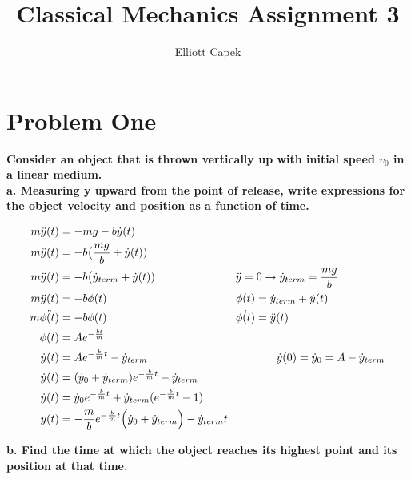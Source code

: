 \documentclass[10pt]{article} %
\title{Classical Mechanics Assignment 3}
\author{Elliott Capek}
\begin{document}
\maketitle{}

\section{Problem One}
\textbf{Consider an object that is thrown vertically up with initial speed $v_0$ in a linear medium.} \\

\textbf{a. Measuring y upward from the point of release, write expressions for the object velocity and position as a function of time.}

\begin{align*}
  m\ddot{y}(t) &= -mg - b\dot{y}(t)\\
  m\ddot{y}(t) &= -b\big(\frac{mg}{b} + \dot{y}(t))\\
  m\ddot{y}(t) &= -b\big(\dot{y}_{term} + \dot{y}(t))
  \hspace{1in}\ddot{y} = 0 \rightarrow \dot{y}_{term} = \frac{mg}{b}\\
  m\ddot{y}(t) &= -b\phi(t)
  \hspace{1.6in} \phi(t) = \dot{y}_{term} + \dot{y}(t)\\
  m\ddot{\phi(t)} &= -b\phi(t)
  \hspace{1.6in} \dot{\phi(t)} = \ddot{y}(t)\\
  \phi(t) &= Ae^{-\frac{bt}{m}}\\
  \dot{y}(t) &= Ae^{-\frac{b}{m}t} - \dot{y}_{term}
  \hspace{1.6in} \dot{y}(0) = \dot{y}_0 = A - \dot{y}_{term}\\
  \dot{y}(t) &= (\dot{y}_0 + \dot{y}_{term})e^{-\frac{b}{m}t} - \dot{y}_{term}\\
  \dot{y}(t) &= \dot{y}_0e^{-\frac{b}{m}t} + \dot{y}_{term}(e^{-\frac{b}{m}t} - 1)\\
  y(t) &= -\frac{m}{b}e^{-\frac{b}{m}t}\Big(\dot{y}_0 + \dot{y}_{term} \Big) - \dot{y}_{term}t\\
\end{align*}

\textbf{b. Find the time at which the object reaches its highest point and its position at that time.}
\end{document}
